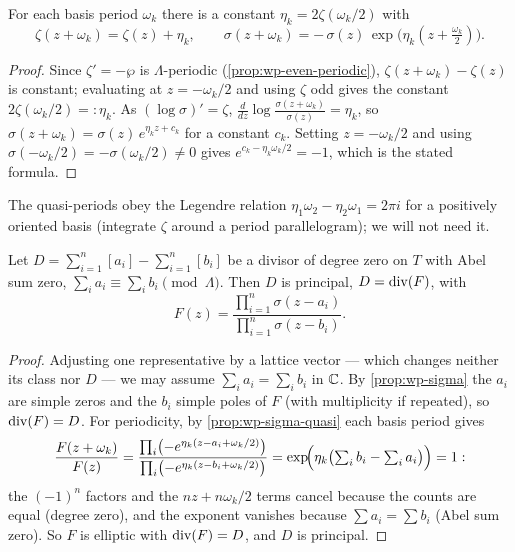 \begin{proposition}
\label{prop:wp-sigma-quasi}
For each basis period \(\omega_k\) there is a constant \(\eta_k = 2\zeta(\omega_k/2)\)
with
\[
  \zeta(z+\omega_k) = \zeta(z) + \eta_k,
  \qquad
  \sigma(z+\omega_k) = -\,\sigma(z)\,\exp\!\bigl(\eta_k(z + \tfrac{\omega_k}{2})\bigr).
\]
\end{proposition}

\begin{proof}
Since \(\zeta' = -\wp\) is \(\Lambda\)-periodic (\cref{prop:wp-even-periodic}),
\(\zeta(z+\omega_k) - \zeta(z)\) is constant; evaluating at \(z = -\omega_k/2\) and
using \(\zeta\) odd gives the constant \(2\zeta(\omega_k/2) =: \eta_k\). As
\((\log\sigma)' = \zeta\), \(\tfrac{d}{dz}\log\tfrac{\sigma(z+\omega_k)}{\sigma(z)}
= \eta_k\), so \(\sigma(z+\omega_k) = \sigma(z)\,e^{\eta_k z + c_k}\) for a constant
\(c_k\). Setting \(z = -\omega_k/2\) and using \(\sigma(-\omega_k/2) =
-\sigma(\omega_k/2) \neq 0\) gives \(e^{c_k - \eta_k\omega_k/2} = -1\), which is the
stated formula.
\end{proof}

\begin{remark}
\label{rem:wp-legendre}
The quasi-periods obey the Legendre relation \(\eta_1\omega_2 - \eta_2\omega_1 =
2\pi i\) for a positively oriented basis (integrate \(\zeta\) around a period
parallelogram); we will not need it.
\end{remark}

\begin{theorem}
\label{thm:wp-converse}
Let \(D = \sum_{i=1}^n [a_i] - \sum_{i=1}^n [b_i]\) be a divisor of degree zero on
\(T\) with Abel sum zero, \(\sum_i a_i \equiv \sum_i b_i \pmod\Lambda\). Then \(D\)
is principal, \(D = \operatorname{div}(F)\), with
\[
  F(z) = \frac{\prod_{i=1}^n \sigma(z - a_i)}{\prod_{i=1}^n \sigma(z - b_i)} .
\]
\end{theorem}

\begin{proof}
Adjusting one representative by a lattice vector --- which changes neither its class
nor \(D\) --- we may assume \(\sum_i a_i = \sum_i b_i\) in \(\mathbb{C}\). By
\cref{prop:wp-sigma} the \(a_i\) are simple zeros and the \(b_i\) simple poles of
\(F\) (with multiplicity if repeated), so \(\operatorname{div}(F) = D\). For periodicity, by
\cref{prop:wp-sigma-quasi} each basis period gives
\[
  \frac{F(z+\omega_k)}{F(z)}
  = \frac{\prod_i\bigl(-e^{\eta_k(z - a_i + \omega_k/2)}\bigr)}
         {\prod_i\bigl(-e^{\eta_k(z - b_i + \omega_k/2)}\bigr)}
  = \exp\!\Bigl(\eta_k\bigl(\textstyle\sum_i b_i - \sum_i a_i\bigr)\Bigr) = 1 :
\]
the \((-1)^n\) factors and the \(nz + n\omega_k/2\) terms cancel because the counts
are equal (degree zero), and the exponent vanishes because \(\sum a_i = \sum b_i\)
(Abel sum zero). So \(F\) is elliptic with \(\operatorname{div}(F) = D\), and \(D\) is
principal.
\end{proof}

